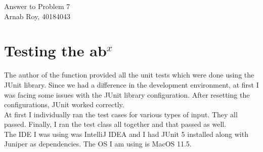 \documentclass[12pt]{article}
\begin{document}
\begin{center}
    \huge{Answer to Problem 7} \\
\large{Arnab Roy, 40184043}
\end{center}

\section{Testing the ab$^x$}
The author of the function provided all the unit tests which were done using the JUnit library. Since we had a difference in the development environment, at first I was facing some issues with the JUnit library configuration. After resetting the configurations, JUnit worked correctly. \\
At first I individually ran the test cases for various types of input. They all passed. Finally, I ran the test class all together and that passed as well.\\
The IDE I was using was IntelliJ IDEA and I had JUnit 5 installed along with Juniper as dependencies. The OS I am using is MacOS 11.5.
\end{document}
